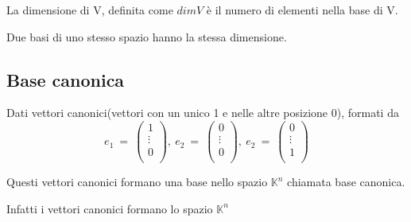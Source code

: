 \documentclass[a4paper, 10pt]{article}
\begin{document}
La dimensione di V, definita come $dimV$ è il numero di elementi nella base di V.

Due basi di uno stesso spazio hanno la stessa dimensione.
\subsection{Base canonica}

Dati vettori canonici(vettori con un unico 1 e nelle altre posizione 0), formati da $$e_1\ =\ \left(\begin{matrix}1\\\vdots\\0\\\end{matrix}\right),\ e_2\ =\ \left(\begin{matrix}0\\\vdots\\0\\\end{matrix}\right),\ e_2\ =\ \left(\begin{matrix}0\\\vdots\\1\\\end{matrix}\right) $$

Questi vettori canonici formano una base nello spazio $\mathbb{K}^n$ chiamata base canonica.

Infatti i vettori canonici formano lo spazio $\mathbb{K}^n$ 
\end{document}
